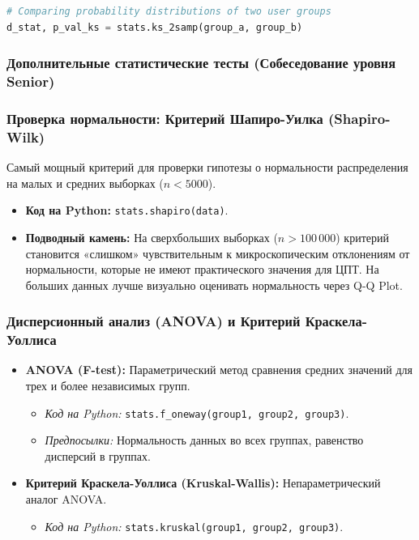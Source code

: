 \documentclass[12pt]{article}
\begin{document}
\begin{lstlisting}[language=Python, caption={Двухвыборочный критерий Колмогорова-Смирнова}]
# Comparing probability distributions of two user groups
d_stat, p_val_ks = stats.ks_2samp(group_a, group_b)
\end{lstlisting}

\subsubsection{Дополнительные статистические тесты (Собеседование уровня Senior)}

\subsubsection{Проверка нормальности: Критерий Шапиро-Уилка (Shapiro-Wilk)}
Самый мощный критерий для проверки гипотезы о нормальности распределения на малых и средних выборках ($n < 5000$).
\begin{itemize}
    \item \textbf{Код на Python:} \texttt{stats.shapiro(data)}.
    \item \textbf{Подводный камень:} На сверхбольших выборках ($n > 100\,000$) критерий становится «слишком» чувствительным к микроскопическим отклонениям от нормальности, которые не имеют практического значения для ЦПТ. На больших данных лучше визуально оценивать нормальность через Q-Q Plot.
\end{itemize}

\subsubsection{Дисперсионный анализ (ANOVA) и Критерий Краскела-Уоллиса}
\begin{itemize}
    \item \textbf{ANOVA (F-test):} Параметрический метод сравнения средних значений для трех и более независимых групп.
    \begin{itemize}
        \item \textit{Код на Python:} \texttt{stats.f\_oneway(group1, group2, group3)}.
        \item \textit{Предпосылки:} Нормальность данных во всех группах, равенство дисперсий в группах.
    \end{itemize}
    \item \textbf{Критерий Краскела-Уоллиса (Kruskal-Wallis):} Непараметрический аналог ANOVA.
    \begin{itemize}
        \item \textit{Код на Python:} \texttt{stats.kruskal(group1, group2, group3)}.
    \end{itemize}
\end{itemize}
\end{document}

